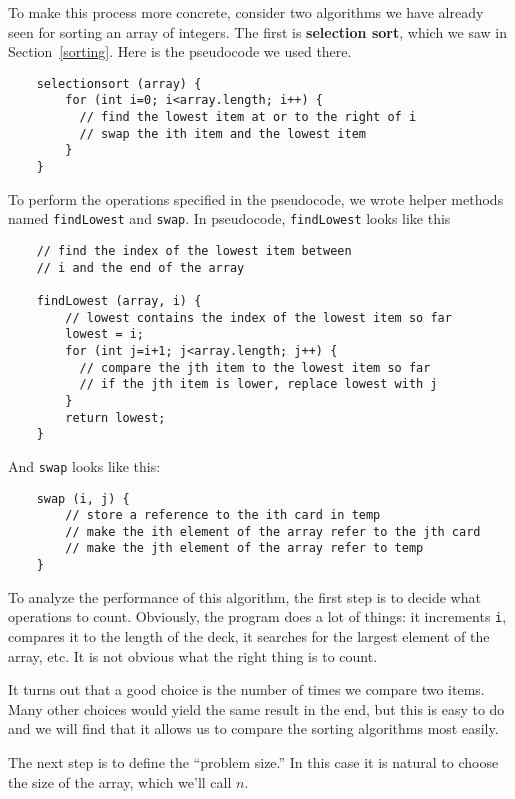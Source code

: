 To make this process more concrete, consider two algorithms we
have already seen for sorting an array of integers.  The
first is {\bf selection sort}, which we saw in Section~\ref{sorting}.
Here is the pseudocode we used there.

\begin{verbatim}
    selectionsort (array) {
        for (int i=0; i<array.length; i++) {
          // find the lowest item at or to the right of i
          // swap the ith item and the lowest item
        }
    }
\end{verbatim}
%
To perform the
operations specified in the pseudocode, we wrote helper methods named
{\tt findLowest} and {\tt swap}.  In pseudocode,
{\tt findLowest} looks like this

\begin{verbatim}
    // find the index of the lowest item between
    // i and the end of the array

    findLowest (array, i) {
        // lowest contains the index of the lowest item so far
        lowest = i;
        for (int j=i+1; j<array.length; j++) {
          // compare the jth item to the lowest item so far
          // if the jth item is lower, replace lowest with j
        }
        return lowest;
    }
\end{verbatim}
%
And {\tt swap} looks like this:

\begin{verbatim}
    swap (i, j) {
        // store a reference to the ith card in temp
        // make the ith element of the array refer to the jth card
        // make the jth element of the array refer to temp
    }
\end{verbatim}
%
To analyze the performance of this algorithm, 
the first step is to decide what operations to count.  Obviously,
the program does a lot of things: it increments {\tt i}, compares
it to the length of the deck, it searches for the largest element
of the array, etc.  It is not obvious what the right thing is
to count.


It turns out that a good choice is the number of
times we compare two items.  Many other choices would yield
the same result in the end, but this is easy to do and we will
find that it allows us to compare the sorting algorithms
most easily.

The next step is to define the ``problem size.''  In this case
it is natural to choose the size of the array, which we'll call
$n$.


